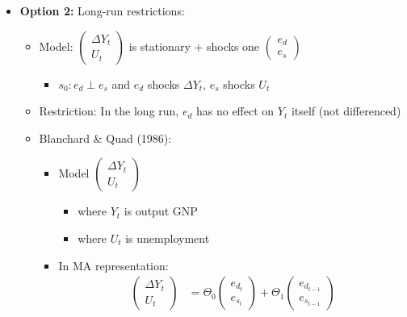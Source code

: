 \begin{itemize}
\begin{itemize}
    \end{itemize}
    \item \textbf{Option 2:} Long-run restrictions:
    \begin{itemize}
        \item Model: $\begin{pmatrix}
            \Delta Y_t \\
            U_t
        \end{pmatrix}$ is stationary + shocks one $\begin{pmatrix}
            e_d \\
            e_s
        \end{pmatrix}$
        \begin{itemize}
            \item $s_0: e_d \perp e_s$ and $e_d$ shocks $\Delta Y_t$, $e_s$ shocks $U_t$
        \end{itemize}
        \item Restriction: In the long run, $e_d$ has no effect on $Y_t$ itself (not differenced) 
        \item Blanchard \& Quad (1986):
        \begin{itemize}
            \item Model $\begin{pmatrix}
                \Delta Y_t \\
                U_t
            \end{pmatrix}$
            \begin{itemize}
                \item where $Y_t$ is output GNP
                \item where $U_t$ is unemployment
            \end{itemize}
            \item In MA representation: 
            \begin{align*}
                \begin{pmatrix}
                    \Delta Y_t \\
                    U_t
                \end{pmatrix} &= \Theta_0 \begin{pmatrix}
                    e_{d_t} \\
                    e_{s_t}
                \end{pmatrix} + \Theta_1 \begin{pmatrix}
                    e_{d_{t-1}} \\
                    e_{s_{t-1}}

\end{pmatrix}
\end{align*}
\end{itemize}
\end{itemize}
\end{itemize}
